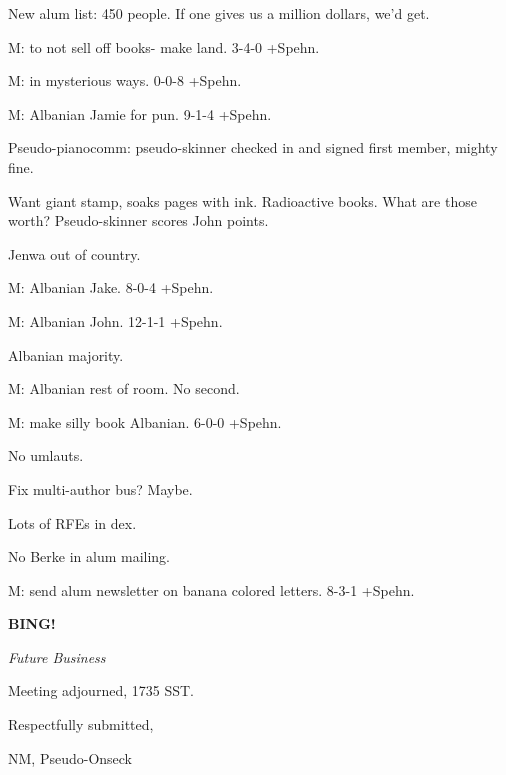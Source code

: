 \documentclass[12pt]{article}
\newcommand{\bing}{{\bf BING!} }
\newcommand{\goto}[1]{\bing \vskip 12pt \centerline{{\em{#1}}}}
\begin{document}
New alum list: 450 people. If one gives us a million dollars, we'd get.

M: to not sell off books- make land. 3-4-0 +Spehn.

M: in mysterious ways. 0-0-8 +Spehn.

M: Albanian Jamie for pun. 9-1-4 +Spehn.

Pseudo-pianocomm: pseudo-skinner checked in and signed first member, mighty fine.

Want giant stamp, soaks pages with ink. Radioactive books. What are those worth? Pseudo-skinner scores John points.

Jenwa out of country.

M: Albanian Jake. 8-0-4 +Spehn.

M: Albanian John. 12-1-1 +Spehn.

Albanian majority.

M: Albanian rest of room. No second.

M: make silly book Albanian. 6-0-0 +Spehn.

No umlauts.

Fix multi-author bus? Maybe.

Lots of RFEs in dex.

No Berke in alum mailing.

M: send alum newsletter on banana colored letters. 8-3-1 +Spehn.

\goto{Future Business}

\vspace{12pt}

\noindent
Meeting adjourned, 1735 SST.

\vspace{18pt}

\centerline{Respectfully submitted,}
\centerline{NM, Pseudo-Onseck}
\end{document}
